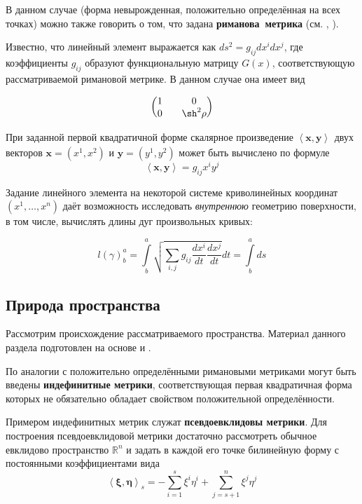 \documentclass{article}
\numberwithin{equation}{section}
\newcommand{\neword}[1]{\textbf{#1}}
\newcommand{\scalmult}[2]{{\left \langle #1 \right \rangle}_{#2}}
\renewcommand{\vec}{\mathbf}
\begin{document}
В данном случае (форма невырожденная, положительно определённая на
всех точках) можно также говорить о том, что задана
\neword{риманова метрика} (см. \cite{dubrovin98}, \cite{fomenko00}).

Известно, что линейный элемент выражается как
\mbox{$ds^2=g_{ij}dx^idx^j$}, где коэффициенты $g_{ij}$ образуют
функциональную матрицу $G(x)$, соответствующую рассматриваемой
римановой метрике. В данном случае она имеет вид

\begin{equation*}
  \begin{pmatrix}
    1 && 0 \\
    0 && \sh^2{\rho}
  \end{pmatrix}
\end{equation*}

При заданной первой квадратичной форме скалярное произведение
$\scalmult{\vec{x}, \vec{y}}{}$ двух векторов $\vec{x}=(x^1,x^2)$ и
$\vec{y}=(y^1,y^2)$ может быть вычислено по формуле
\begin{equation}\label{eq:scalmult}
  \scalmult{\vec{x}, \vec{y}}{} = g_{ij}x^i y^j
\end{equation}

Задание линейного элемента на некоторой системе криволинейных
координат $(x^1, \dotsc , x^n)$ даёт возможность исследовать
\emph{внутреннюю} геометрию поверхности, в том числе, вычислять длины
дуг произвольных кривых:

\begin{equation}\label{eq:riemann-curve-length}
  l(\gamma)^a_b = \int \limits^a_b {\sqrt{\sum_{i,j}{g_{ij}
        \frac{dx^i}{dt} \frac{dx^j}{dt}}} dt} = \int \limits^a_b ds
\end{equation}

\subsection{Природа пространства}
\label{sec:what-is-up}
Рассмотрим происхождение рассматриваемого пространства. Материал
данного раздела подготовлен на основе \cite{fomenko00} и
\cite{dubrovin98}.

По аналогии с положительно определёнными римановыми метриками могут
быть введены \neword{индефинитные метрики}, соответствующая первая
квадратичная форма которых не обязательно обладает свойством
положительной определённости.

Примером индефинитных метрик служат \neword{псевдоевклидовы метрики}.
Для построения псевдоевклидовой метрики достаточно рассмотреть обычное
евклидово пространство $\mathbb{R}^n$ и задать в каждой его точке
билинейную форму с постоянными коэффициентами вида
\begin{equation*}
  \scalmult{\vec{\xi}, \vec{\eta}}{s} = -\sum_{i=1}^s {\xi^i \eta^i} +
\sum_{j=s+1}^n {\xi^j \eta^j}
\end{equation*}
\end{document}
